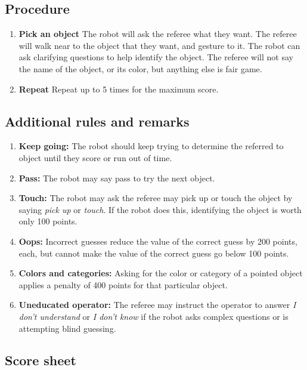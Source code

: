 %
%
\subsection{Procedure}
\begin{enumerate}
	\item \textbf{Pick an object} The robot will ask the referee what they want. The referee will walk near to the object that they want, and gesture to it. The robot can ask clarifying questions to help identify the object. The referee will not say the name of the object, or its color, but anything else is fair game.
  \item \textbf{Repeat} Repeat up to 5 times for the maximum score.


\end{enumerate}


%
%
\subsection{Additional rules and remarks}
\begin{enumerate}
	\item \textbf{Keep going:} The robot should keep trying to determine the referred to object until they score or run out of time.
	\item \textbf{Pass:} The robot may say pass to try the next object.
	\item \textbf{Touch:} The robot may ask the referee may pick up or touch the object by saying \textit{pick up} or \textit{touch}. If the robot does this, identifying the object is worth only 100 points.
	\item \textbf{Oops:} Incorrect guesses reduce the value of the correct guess by 200 points, each, but cannot make the value of the correct guess go below 100 points.
\item\textbf{Colors and categories:} Asking for the color or category of a pointed object applies a penalty of 400 points for that particular object.
\item\textbf{Uneducated operator:} The referee may instruct the operator to answer \emph{I don't understand} or \emph{I don't know} if the robot asks complex questions or is attempting blind guessing.

\end{enumerate}
\newpage
\subsection{Score sheet}


